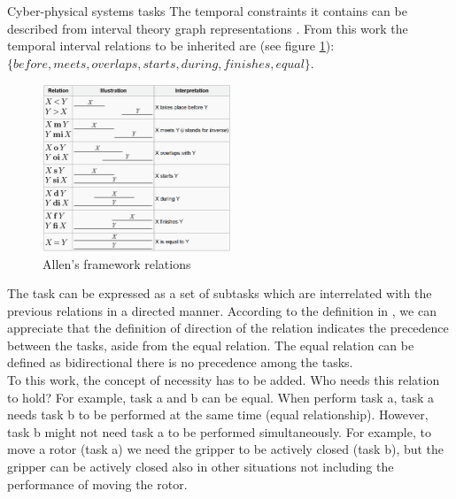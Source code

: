 \documentclass[a4paper,10pt]{article}
\begin{document}
Cyber-physical systems tasks %
The temporal constraints it contains can be described from interval theory graph representations \cite{1}.
From this work the temporal interval relations to be inherited are (see figure \ref{fig:allens_framework}): \\
$\{ before ,meets ,overlaps ,starts ,during ,finishes ,equal \}$.
\\
\begin{figure}[h]
    \centering
    \includegraphics[width=0.5\textwidth]{allens_framework.png}
    \caption{Allen's framework relations}
    \label{fig:allens_framework}
\end{figure}



The task can be expressed as a set of subtasks which are interrelated with the previous relations in a directed manner. According to the definition in \cite{1}, we can appreciate that the definition of direction of the relation indicates the precedence between the tasks, aside from the equal relation. The equal relation can be defined as bidirectional there is no precedence among the tasks.
\\

To this work, the concept of necessity has to be added. Who needs this relation to hold? 
For example, task a and b can be equal. When perform task a, task a needs task b to be performed at the same time (equal relationship). However, task b might not need task a to be performed simultaneously. For example, to move a rotor (task a) we need the gripper to be actively closed (task b), but the gripper can be actively closed also in other situations not including the performance of moving the rotor. 
\\
\end{document}
